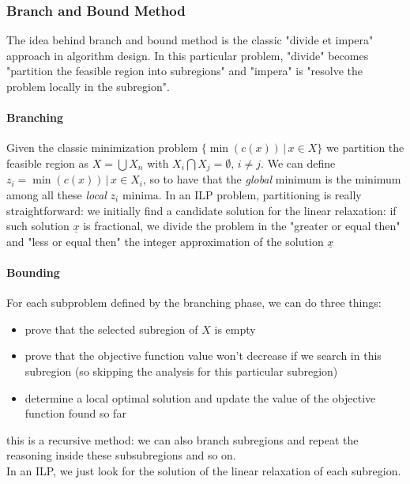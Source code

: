 \documentclass{article}
\begin{document}
			\subsubsection{Branch and Bound Method}
				The idea behind branch and bound method is the classic "divide et impera" approach in algorithm design. In this particular problem, "divide" becomes "partition the feasible region into subregions" and "impera" is "resolve the problem locally in the subregion".

				\paragraph{Branching}
					Given the classic minimization problem $\{\min(c(x)) \,\vert\, x \in X\}$ we partition the feasible region as $X = \bigcup X_n$ with $X_i \bigcap X_j = \emptyset,\, i \neq j$. We can define $z_i = \min(c(x)) \,\vert\, x \in X_i$, so to have that the \textit{global} minimum is the minimum among all these \textit{local} $z_i$ minima. In an ILP problem, partitioning is really straightforward: we initially find a candidate solution for the linear relaxation: if such solution $\underline{x}$ is fractional, we divide the problem in the "greater or equal then" and "less or equal then" the integer approximation of the solution $\underline{x}$

				\paragraph{Bounding}
					For each subproblem defined by the branching phase, we can do three things:
					\begin{itemize}
						\item prove that the selected subregion of $X$ is empty
						\item prove that the objective function value won't decrease if we search in this subregion (so skipping the analysis for this particular subregion)
						\item determine a local optimal solution and update the value of the objective function found so far
					\end{itemize}
					this is a recursive method: we can also branch subregions and repeat the reasoning inside these subsubregions and so on.\\
					In an ILP, we just look for the solution of the linear relaxation of each subregion.
\end{document}
